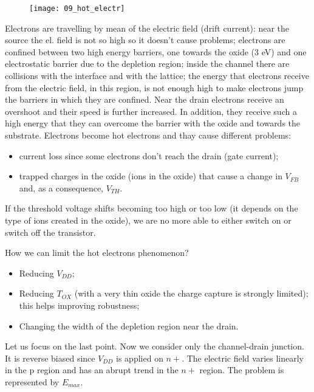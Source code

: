 \documentclass[a4paper, 12pt, twoside, openright]{report}
\begin{document}
{	\begin{figure}[H]
	\centering
	\texttt{[image: 09\_hot\_electr]}
	\caption{}
	\label{}
	\end{figure}

Electrons are travelling by mean of the electric field (drift current): near the source the el. field is not so high so it doesn't cause problems; electrons are confined between two high energy barriers, one towards the oxide (3 eV) and one electrostatic barrier due to the depletion region; inside the channel there are collisions with the interface and with the lattice; the energy that electrons receive from the electric field, in this region, is not enough high to make electrons jump the barriers in which they are confined. Near the drain electrons receive an overshoot and their speed is further increased. In addition, they receive such a high energy that they can overcome the barrier with the oxide and towards the substrate. Electrons become hot electrons and thay cause different problems:

\begin{itemize}
\item current loss since some electrons don't reach the drain (gate current);
\item trapped charges in the oxide (ions in the oxide) that cause a change in $V_{FB}$ and, as a consequence, $V_{TH}$.
\end{itemize}

If the threshold voltage shifts becoming too high or too low (it depends on the type of ions created in the oxide), we are no more able to either switch on or switch off the transistor.

How we can limit the hot electrons phenomenon?

\begin{itemize}
\item Reducing $V_{DD}$;
\item Reducing $T_{OX}$ (with a very thin oxide the charge capture is strongly limited); this helps improving robustness;
\item Changing the width of the depletion region near the drain.
\end{itemize}

Let us focus on the last point. Now we consider only the channel-drain junction. It is reverse biased since $V_{DD}$ is applied on $n+$. The electric field varies linearly in the p region and has an abrupt trend in the $n+$ region. The problem is represented by $E_{max}$.

}
\end{document}

